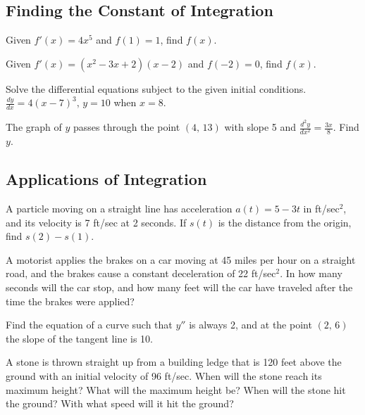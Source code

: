 \subsection*{Finding the Constant of Integration}

\begin{questions}
    \question Given $f'(x)=4x^5$ and $f(1)=1$, find $f(x)$.
    
    \question Given $f'(x)=(x^2-3x+2)(x-2)$ and $f(-2)=0$, find $f(x)$.
    
    Solve the differential equations subject to the given initial conditions.
    \question $\displaystyle\frac{dy}{dx}=4(x-7)^3,\,y=10$ when $x=8$.
    
    \question The graph of $y$ passes through the point $(4,\,13)$ with slope 5 and $\displaystyle\frac{d^2y}{dx^2}=\frac{3x}{8}$. Find $y$.
\end{questions}

\subsection*{Applications of Integration}
\begin{questions}
    \setcounter{question}{4}
    \question A particle moving on a straight line has acceleration $a(t)=5-3t$ in ft/sec$^2$, and its velocity is 7 ft/sec at 2 seconds. If $s(t)$ is the distance from the origin, find $s(2)-s(1)$.
    
    
    \newpage
    
    \question A motorist applies the brakes on a car moving at 45 miles per hour on a straight road, and the brakes cause a constant deceleration of 22 ft/sec$^2$. In how many seconds will the car stop, and how many feet will the car have traveled after the time the brakes were applied?
    
    \question Find the equation of a curve such that $y''$ is always 2, and at the point $(2,\,6)$ the slope of the tangent line is 10.
    
    \question A stone is thrown straight up from a building ledge that is 120 feet above the ground with an initial velocity of 96 ft/sec. When will the stone reach its maximum height? What will the maximum height be? When will the stone hit the ground? With what speed will it hit the ground?
    
    
\end{questions}


\newpage
